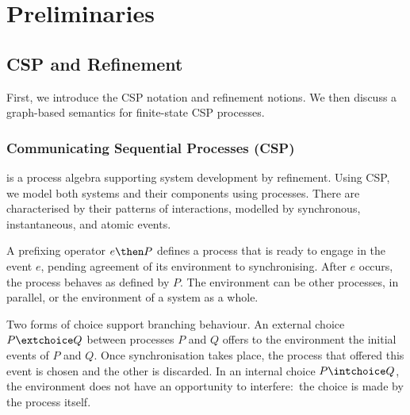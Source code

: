 \section{Preliminaries}
\label{section:preliminaries}

\subsection{CSP and Refinement}

First, we introduce the CSP notation and refinement notions. We then discuss
a graph-based semantics for finite-state CSP processes.


\subsubsection*{Communicating Sequential Processes (CSP)} is a process algebra 
supporting system development by refinement. Using CSP, we model both systems and
their components using processes. There are characterised by their patterns
of interactions, modelled by synchronous, instantaneous, and atomic events.

A prefixing operator $e \then P$ defines a process that is ready to engage in
the event $e$, pending agreement of its environment to synchronising. After
$e$ occurs, the process behaves as defined by $P$. The environment can be
other processes, in parallel, or the environment of a system as a whole.

Two forms of choice support branching behaviour. An external choice $P
\extchoice Q$ between processes $P$ and $Q$ offers to the environment the
initial events of $P$ and $Q$. Once synchronisation takes place, the process
that offered this event is chosen and the other is discarded. In an internal
choice $P \intchoice Q$, the environment does not have an opportunity to
interfere:~the choice is made by the process itself.

